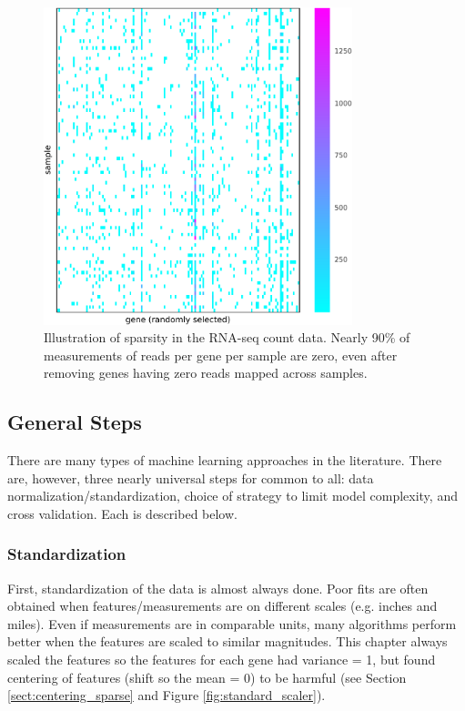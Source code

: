 \begin{figure}[H]
\centering
    \includegraphics[width=0.8\textwidth]{./tex/chapter3/figures/20170403_sparsity_illustration--754836_nonzero_features.pdf}
    \begin{singlespace}
    \caption[Illustration of sparsity in the RNA-seq count data]{
        Illustration of sparsity in the RNA-seq count data.
        Nearly 90\% of measurements of reads per gene per sample are zero, even after removing genes having zero reads mapped across samples.
        }
    \label{fig:sparse_RNA-seq}
    \end{singlespace}
\end{figure}


\subsection{General Steps}

There are many types of machine learning approaches in the literature.
There are, however, three nearly universal steps for common to all: data normalization/standardization, choice of strategy to limit model complexity, and cross validation.
Each is described below.

\subsubsection{Standardization}
First, standardization of the data is almost always done.
Poor fits are often obtained when features/measurements are on different scales (e.g. inches and miles).
Even if measurements are in comparable units, many algorithms perform better when the features are scaled to similar magnitudes.
This chapter always scaled the features so the features for each gene had variance = 1, but found centering of features (shift so the mean = 0) to be harmful (see Section \ref{sect:centering_sparse} and Figure \ref{fig:standard_scaler}).

